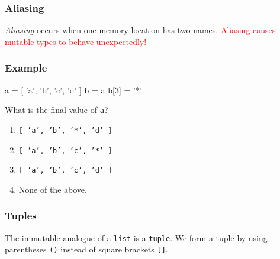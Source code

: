 \documentclass[11pt]{beamer}
\begin{document}
\begin{frame}[fragile]
  \frametitle{Aliasing}
  \Enlarge

  \begin{itemize}
  \myitem  \emph{Aliasing} occurs when one memory location has two names.
  \myitem  \textcolor{red}{Aliasing causes mutable types to behave unexpectedly!}
  \end{itemize}
  \begin{semiverbatim}

  \end{semiverbatim}
\end{frame}


\begin{frame}[fragile]
  \frametitle{Example}
  \Enlarge

  \begin{semiverbatim}
a = [ 'a', 'b', 'c', 'd' ]
b = a
b[3] = '*'
  \end{semiverbatim}
  What is the final value of \texttt{a}?
  \begin{enumerate}[label=\Alph*]
  \item  \texttt{[ 'a', 'b', '*', 'd' ]}
  \item  \texttt{[ 'a', 'b', 'c', '*' ]}
  \item  \texttt{[ 'a', 'b', 'c', 'd' ]}
  \item  None of the above.
  \end{enumerate}
\end{frame}

\begin{frame}[fragile]
  \frametitle{Tuples}
  \Enlarge

  \begin{itemize}
  \myitem  The immutable analogue of a \texttt{list} is a \texttt{tuple}.
  \myitem  We form a tuple by using parentheses \texttt{()} instead of square brackets \texttt{[]}.
  \end{itemize}
\end{frame}
\end{document}
